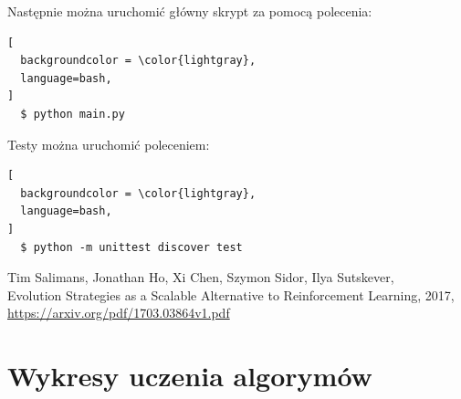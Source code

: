 \documentclass[12pt,a4paper]{article}
\begin{document}
\bigskip

Następnie można uruchomić główny skrypt za pomocą polecenia:

\begin{lstlisting}[
  backgroundcolor = \color{lightgray},
  language=bash,
]
  $ python main.py
\end{lstlisting}

Testy można uruchomić poleceniem:

\begin{lstlisting}[
  backgroundcolor = \color{lightgray},
  language=bash,
]
  $ python -m unittest discover test
\end{lstlisting}

\pagebreak
\begin{thebibliography}{9}
  Tim Salimans, Jonathan Ho, Xi Chen, Szymon Sidor, Ilya Sutskever,\\
  Evolution Strategies as a Scalable Alternative to Reinforcement Learning,
  2017, \href{https://arxiv.org/pdf/1703.03864v1.pdf}{https://arxiv.org/pdf/1703.03864v1.pdf}

\end{thebibliography}

\pagebreak
\appendix
\section{Wykresy uczenia algorymów}
\end{document}
